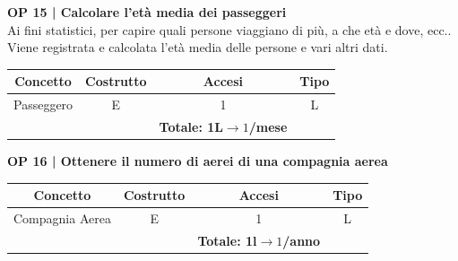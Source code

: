 \vspace{.6cm}


\textbf{\small OP 15 | Calcolare l'età media dei passeggeri}\\


\textsf{\small Ai fini statistici, per capire quali persone viaggiano di più, a che età e dove, ecc.. Viene registrata e calcolata l'età media delle persone e vari altri dati.}\break


\begin{tabular}{ c c c c}
	\hline
	\rowcolor{airforceblue}
	\textbf{\color{white}Concetto} & \textbf{\color{white}Costrutto} & \textbf{\color{white}Accesi} & \textbf{\color{white}Tipo}\\
	\hline
	\textsf{\small Passeggero} & \textsf{\small E} & \textsf{\small 1} &  \textsf{\small L}\\
	\hline
	\rowcolor{airforceblue}
	\textsf{\small } & \textsf{\small } & \textbf{\color{white}Totale: 1L$\rightarrow 1$/mese } \textsf{\small } & \textsf{\small }\\
	\hline
\end{tabular}

\vspace{.6cm}


\textbf{\small OP 16 | Ottenere il numero di aerei di una compagnia aerea}\\

\begin{tabular}{ c c c c}
	\hline
	\rowcolor{airforceblue}
	\textbf{\color{white}Concetto} & \textbf{\color{white}Costrutto} & \textbf{\color{white}Accesi} & \textbf{\color{white}Tipo}\\
	\hline
	\textsf{\small Compagnia Aerea} & \textsf{\small E} & \textsf{\small 1} &  \textsf{\small L}\\
	\hline
	\rowcolor{airforceblue}
	\textsf{\small } & \textsf{\small } & \textbf{\color{white}Totale: 1l$\rightarrow 1$/anno } \textsf{\small } & \textsf{\small }\\
	\hline
\end{tabular}

\vspace{.6cm}

